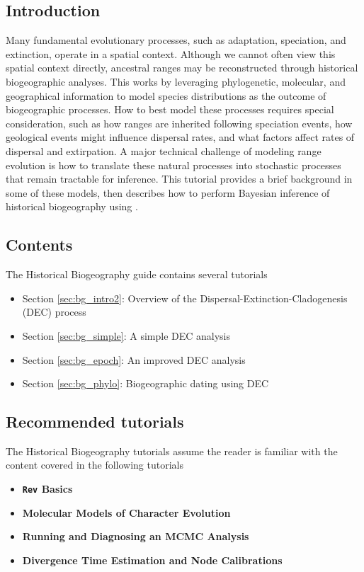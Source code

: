 \subsection{Introduction}

Many fundamental evolutionary processes, such as adaptation, speciation, and extinction, operate in a spatial context. 
Although we cannot often view this spatial context directly, ancestral ranges may be reconstructed through historical biogeographic analyses.
This works by leveraging phylogenetic, molecular, and geographical information to model species distributions as the outcome of biogeographic processes.
How to best model these processes requires special consideration, such as how ranges are inherited following speciation events, how geological events might influence dispersal rates, and what factors affect rates of dispersal and extirpation.
A major technical challenge of modeling range evolution is how to translate these natural processes into stochastic processes that remain tractable for inference.
This tutorial provides a brief background in some of these models, then describes how to perform Bayesian inference of historical biogeography using \RevBayes.

\subsection{Contents}

The Historical Biogeography guide contains several tutorials

\begin{itemize}
\item Section \ref{sec:bg_intro2}: Overview of the Dispersal-Extinction-Cladogenesis (DEC) process
\item Section \ref{sec:bg_simple}: A simple DEC analysis
\item Section \ref{sec:bg_epoch}: An improved DEC analysis
\item Section \ref{sec:bg_phylo}: Biogeographic dating using DEC
\end{itemize}

\subsection{Recommended tutorials}

The Historical Biogeography tutorials assume the reader is familiar with the content covered in the following \RevBayes tutorials

\begin{itemize}
\item {\bf {\tt \large Rev} Basics}
\item {\bf Molecular Models of Character Evolution}
\item {\bf Running and Diagnosing an MCMC Analysis}
\item {\bf Divergence Time Estimation and Node Calibrations}
\end{itemize}

\newpage
